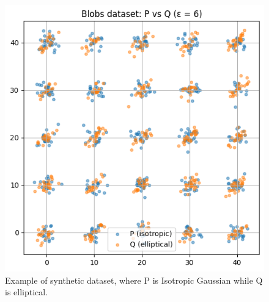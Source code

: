 \documentclass{article}
\begin{document}
\begin{figure}
\begin{minipage}{0.25\textwidth}
    \centering
    \includegraphics[width=\textwidth]{MMD/Example.png}
    \caption{Example of synthetic dataset, where P is Isotropic Gaussian while Q is elliptical.}
    \label{fig:mmd_example}
  \end{minipage}
  

\end{figure}
\end{document}
